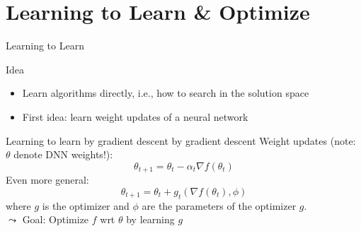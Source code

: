\section{Learning to Learn \& Optimize}
\begin{frame}[c]{Learning to Learn}

\begin{block}{Idea}
	\begin{itemize}
		\item Learn algorithms directly, i.e., how to search in the solution space
		\item First idea: learn weight updates of a neural network
	\end{itemize}
\end{block}

\pause

\begin{block}{Learning to learn by gradient descent by gradient descent\newline {}}
	Weight updates (note: \alert{$\theta$ denote DNN weights!}):
	\begin{equation}
	\theta_{t+1} = \theta_t - \alpha_t \nabla f(\theta_t) \nonumber
	\end{equation}
	\pause
	Even more general:
	\begin{equation}
	\theta_{t+1} = \theta_t + g_t(\nabla f(\theta_t), \phi) \nonumber
	\end{equation}
	where $g$ is the optimizer and $\phi$ are the parameters of the optimizer $g$.\\
	\pause
	$\leadsto$ \alert{Goal: Optimize $f$ wrt $\theta$ by learning $g$}
\end{block}

\end{frame}
